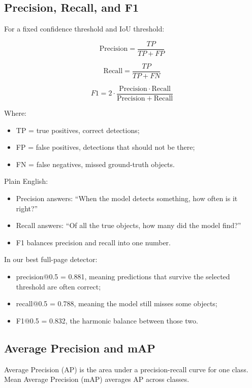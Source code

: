 \documentclass[11pt]{article}
\begin{document}
\subsection{Precision, Recall, and F1}

For a fixed confidence threshold and IoU threshold:

\[
\mathrm{Precision} = \frac{TP}{TP+FP}
\]

\[
\mathrm{Recall} = \frac{TP}{TP+FN}
\]

\[
F1 = 2 \cdot \frac{\mathrm{Precision}\cdot\mathrm{Recall}}{\mathrm{Precision}+\mathrm{Recall}}
\]

Where:

\begin{itemize}
  \item TP = true positives, correct detections;
  \item FP = false positives, detections that should not be there;
  \item FN = false negatives, missed ground-truth objects.
\end{itemize}

Plain English:

\begin{itemize}
  \item Precision answers: ``When the model detects something, how often is it right?''
  \item Recall answers: ``Of all the true objects, how many did the model find?''
  \item F1 balances precision and recall into one number.
\end{itemize}

In our best full-page detector:

\begin{itemize}
  \item precision@0.5 = 0.881, meaning predictions that survive the selected threshold are often correct;
  \item recall@0.5 = 0.788, meaning the model still misses some objects;
  \item F1@0.5 = 0.832, the harmonic balance between those two.
\end{itemize}

\subsection{Average Precision and mAP}

Average Precision (AP) is the area under a precision-recall curve for one class. Mean Average Precision (mAP) averages AP across classes.
\end{document}
